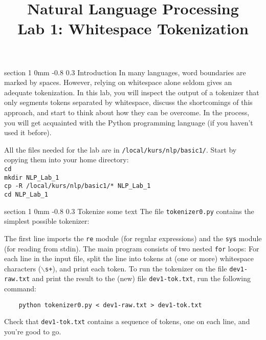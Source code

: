 \documentclass[11pt]{article}
\title{{\LARGE Natural Language Processing}\\[1.5mm]{\large Lab 1: Whitespace Tokenization}}
\author{}
\date{} %
\makeatletter
\newcommand{\newsec}[2]{\section{#1}\label{sec:#2}\noindent}
\renewcommand{\section}{\@startsection
{section}%
{1}%
{0mm}%
{-0.8\baselineskip}%
{0.3\baselineskip}%
{\bfseries\large}}%
\makeatother
\begin{document}
 

\maketitle
\vspace{-2mm} \newsec{Introduction}{intro}%
In many languages, word boundaries are marked by spaces. However,
relying on whitespace alone seldom gives an adequate tokenization. In
this lab, you will inspect the output of a tokenizer that only
segments tokens separated by whitespace, discuss the shortcomings of
this approach, and start to think about how they can be overcome. In
the process, you will get acquainted with the Python programming
language (if you haven't used it
before). 

All the files needed for
the lab are in {\tt /local/kurs/nlp/basic1/}. Start by copying
them into your home directory:\\
{\tt cd}\\
{\tt mkdir NLP\_Lab\_1}\\
{\tt cp -R /local/kurs/nlp/basic1/* NLP\_Lab\_1}\\
{\tt cd NLP\_Lab\_1}

\newsec{Tokenize some text}{tokenize}%
The file {\tt tokenizer0.py} contains the simplest possible tokenizer:
\begin{center}
\fbox{

}
\end{center}
The first line imports the {\tt re} module (for regular expressions)
and the {\tt sys} module (for reading from stdin). The main program
consists of two nested {\tt for} loops: For each line in the input
file, split the line into tokens at (one or more) whitespace
characters ({\tt {$\backslash$}s+}), and print each token.  To run the
tokenizer on the file {\tt dev1-raw.txt} and print the result to the
(new) file {\tt dev1-tok.txt}, run the following command:
\begin{verbatim}
    python tokenizer0.py < dev1-raw.txt > dev1-tok.txt
\end{verbatim}
Check that {\tt dev1-tok.txt} contains a sequence of tokens, one on
each line, and you're good to go.
\end{document}
